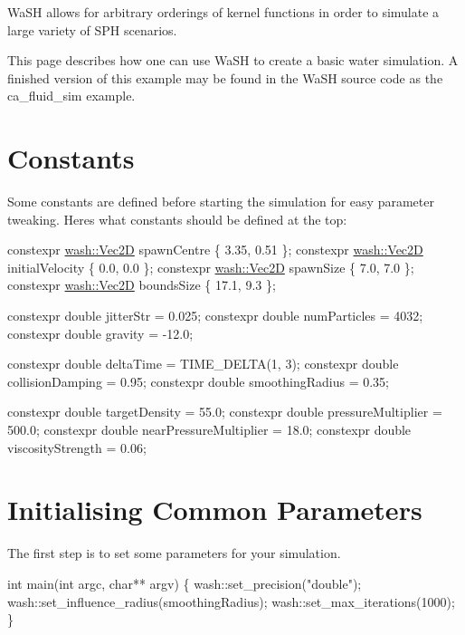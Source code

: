 Wa\+SH allows for arbitrary orderings of kernel functions in order to simulate a large variety of S\+PH scenarios.

This page describes how one can use Wa\+SH to create a basic water simulation. A finished version of this example may be found in the Wa\+SH source code as the {\ttfamily ca\+\_\+fluid\+\_\+sim} example.

\section*{Constants}

Some constants are defined before starting the simulation for easy parameter tweaking. Here\textquotesingle{}s what constants should be defined at the top\+: 
\begin{DoxyCode}
constexpr \mbox{\hyperlink{classwash_1_1Vec}{wash::Vec2D}} spawnCentre \{ 3.35, 0.51 \};
constexpr \mbox{\hyperlink{classwash_1_1Vec}{wash::Vec2D}} initialVelocity \{ 0.0, 0.0 \};
constexpr \mbox{\hyperlink{classwash_1_1Vec}{wash::Vec2D}} spawnSize \{ 7.0, 7.0 \};
constexpr \mbox{\hyperlink{classwash_1_1Vec}{wash::Vec2D}} boundsSize \{ 17.1, 9.3 \};

constexpr \textcolor{keywordtype}{double} jitterStr = 0.025;
constexpr \textcolor{keywordtype}{double} numParticles = 4032;
constexpr \textcolor{keywordtype}{double} gravity = -12.0;

constexpr \textcolor{keywordtype}{double} deltaTime = TIME\_DELTA(1, 3);
constexpr \textcolor{keywordtype}{double} collisionDamping = 0.95;
constexpr \textcolor{keywordtype}{double} smoothingRadius = 0.35;

constexpr \textcolor{keywordtype}{double} targetDensity = 55.0;
constexpr \textcolor{keywordtype}{double} pressureMultiplier = 500.0;
constexpr \textcolor{keywordtype}{double} nearPressureMultiplier = 18.0;
constexpr \textcolor{keywordtype}{double} viscosityStrength = 0.06;
\end{DoxyCode}


\section*{Initialising Common Parameters}

The first step is to set some parameters for your simulation.


\begin{DoxyCode}
\textcolor{keywordtype}{int} main(\textcolor{keywordtype}{int} argc, \textcolor{keywordtype}{char}** argv) \{
    wash::set\_precision(\textcolor{stringliteral}{"double"});
    wash::set\_influence\_radius(smoothingRadius);
    wash::set\_max\_iterations(1000);
\}
\end{DoxyCode}


